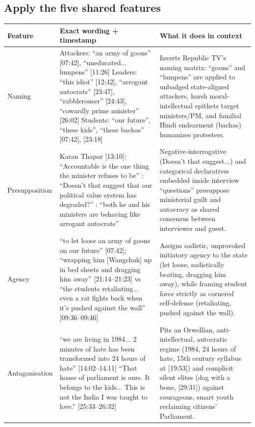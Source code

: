 \documentclass[10pt,a4paper]{article}
\begin{document}
\subsection*{Apply the five shared features}
\par\vspace{4pt}
{\small
\begin{longtable}{@{}>{\raggedright\arraybackslash}p{} >{\raggedright\arraybackslash}p{} >{\raggedright\arraybackslash}p{}@{}}
\toprule
\textbf{Feature} & \textbf{Exact wording + timestamp} & \textbf{What it does in context} \\
\midrule
\endhead
Naming & Attackers: ``an army of goons'' [07:42], ``uneducated... lumpens'' [11:26] \newline  Leaders: ``this idiot'' [12:42], ``arrogant autocrats'' [23:47], ``rabblerouser'' [24:43], ``cowardly prime minister'' [26:02] \newline  Students: ``our future'', ``these kids'', ``these bachas'' [07:42], [23:18] & Inverts Republic TV's naming matrix: ``goons'' and ``lumpens'' are applied to unbadged state-aligned attackers, harsh moral-intellectual epithets target ministers/PM, and familial Hindi endearment (bachas) humanizes protesters. \\
\addlinespace[6pt]
Presupposition & Karan Thapar [13:10]: ``Accountable is the one thing the minister refuses to be'' \newline  [22:40]: ``Doesn't that suggest that our political value system has degraded?'' \newline  [23:47]: ``both he and his ministers are behaving like arrogant autocrats'' & Negative-interrogative (Doesn't that suggest...) and categorical declaratives embedded inside interview ``questions'' presuppose ministerial guilt and autocracy as shared consensus between interviewer and guest. \\
\addlinespace[6pt]
Agency & ``to let loose an army of goons on our future'' [07:42]; ``wrapping him [Wangchuk] up in bed sheets and dragging him away'' [21:14--21:23] vs ``the students retaliating... even a rat fights back when it's pushed against the wall'' [09:36--09:46] & Assigns sadistic, unprovoked initiatory agency to the state (let loose, sadistically beating, dragging him away), while framing student force strictly as cornered self-defense (retaliating, pushed against the wall). \\
\addlinespace[6pt]
Antagonisation & ``we are living in 1984... 2 minutes of hate has been transformed into 24 hours of hate'' [14:02--14:11] \newline  ``That house of parliament is ours. It belongs to the kids... This is not the India I was taught to love.'' [25:33--26:32] & Pits an Orwellian, anti-intellectual, autocratic regime (1984, 24 hours of hate, 15th century syllabus at [19:53]) and complicit silent elites (dog with a bone, [29:31]) against courageous, smart youth reclaiming citizens' Parliament. \\

\end{longtable}}
\end{document}
